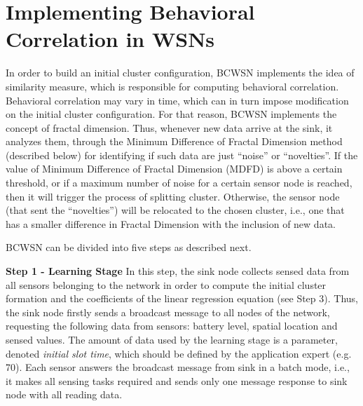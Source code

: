 \documentclass{acm_proc_article-sp}
\begin{document}
\section{Implementing Behavioral Correlation in WSNs}
\label{implementing-bcwsn}

In order to build an initial cluster configuration, BCWSN implements the idea of
similarity measure, which is responsible for computing behavioral correlation.
Behavioral correlation may vary in time, which can in turn impose modification
on the initial cluster configuration. For that reason, BCWSN implements the
concept of fractal dimension. Thus, whenever new data arrive at the sink, it
analyzes them, through the Minimum Difference of Fractal Dimension method
(described below) for identifying if such data are just ``noise'' or
``novelties''. If the value of Minimum Difference of Fractal Dimension (MDFD) is
above a certain threshold, or if a maximum number of noise for a certain sensor
node is reached, then it will trigger the process of splitting cluster.
Otherwise, the sensor node (that sent the ``novelties'') will be relocated to
the chosen cluster, i.e., one that has a smaller difference in Fractal Dimension
with the inclusion of new data.
\vspace*{-.3cm}



BCWSN can be divided into five steps as described next.
\vspace*{-.3cm}

{\bf Step 1 - Learning Stage}
In this step, the sink node collects sensed data from all sensors belonging to
the network in order to compute the initial cluster formation and the
coefficients of the linear regression equation (see Step 3). Thus, the sink 
node firstly sends a broadcast message to all
nodes of the network, requesting the following data from sensors:
battery level, spatial location and sensed values. The amount of data used by the
learning stage is a parameter, denoted \textit{initial slot time}, which should be
defined by the application expert (e.g. 70). Each sensor answers the broadcast
message from sink in a batch mode, i.e., it makes all sensing tasks required and
sends only one message response to sink node with all reading data.
\vspace*{-.3cm}
\end{document}
